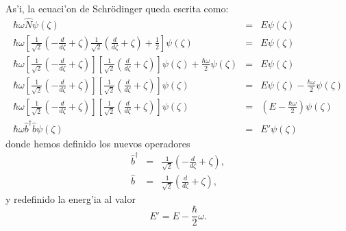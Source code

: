 As'i, la ecuaci'on de Schr\"{o}dinger queda escrita como:%
\begin{eqnarray}
\hbar\omega\hat{N}\psi\left( \zeta\right) & = &E\psi\left( \zeta\right)\\
\hbar\omega\left[ \frac{1}{\sqrt{2}}\left( -\frac{d}{d\zeta}%
+\zeta\right) \frac{1}{\sqrt{2}}\left( \frac{d}{d\zeta}%
+\zeta\right) +\frac{1}{2}\right] \psi\left( \zeta\right) &
=&E\psi\left( \zeta\right) \\
\hbar\omega\left[ \frac{1}{\sqrt{2}}\left( -\frac{d}{d\zeta}%
+\zeta\right) \right] \left[ \frac{1}{\sqrt{2}}\left( \frac{d%
}{d\zeta}+\zeta\right) \right] \psi\left( \zeta\right) +\frac
{\hbar\omega}{2}\psi\left( \zeta\right) & = &E\psi\left( \zeta\right)\\
\hbar\omega\left[ \frac{1}{\sqrt{2}}\left( -\frac{d}{d\zeta}%
+\zeta\right) \right] \left[ \frac{1}{\sqrt{2}}\left( \frac{d%
}{d\zeta}+\zeta\right) \right] \psi\left( \zeta\right) &
=&E\psi\left( \zeta\right) -\frac{\hbar\omega}{2}\psi\left( \zeta\right)\\
\hbar\omega\left[ \frac{1}{\sqrt{2}}\left( -\frac{d}{d\zeta}%
+\zeta\right) \right] \left[ \frac{1}{\sqrt{2}}\left( \frac{d%
}{d\zeta}+\zeta\right) \right] \psi\left( \zeta\right) & = &\left(
E-\frac{\hbar\omega}{2}\right) \psi\left( \zeta\right) \\
\hbar\omega\hat{b}^{\dagger}\hat{b}\psi\left( \zeta\right) & = &E'
\psi\left( \zeta\right) \label{EcSchrodOscArmSimpUnid}%
\end{eqnarray}
donde hemos definido los nuevos operadores%
\begin{eqnarray}
\hat{b}^{\dagger} & = &\frac{1}{\sqrt{2}}\left( -\frac{d}{d\zeta}%
+\zeta\right) \label{bdag} ,\\
\hat{b} & = &\frac{1}{\sqrt{2}}\left( \frac{d}{d\zeta}+\zeta\right) \label{b} ,
\end{eqnarray}
y redefinido la energ'ia al valor%
\begin{equation}
E'=E-\frac{\hbar}{2}\omega .
\end{equation}

